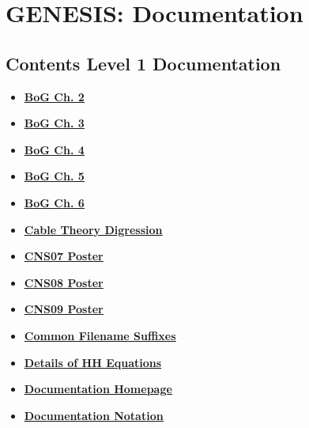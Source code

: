 \documentclass[12pt]{article}
\begin{document}
\section*{GENESIS: Documentation}

\subsection*{Contents Level 1 Documentation}

\begin{itemize}

\item \href{../bog-ch2/bog-ch2.pdf}{\bf \underline{BoG Ch. 2}}

\item \href{../bog-ch3/bog-ch3.pdf}{\bf \underline{BoG Ch. 3}}

\item \href{../bog-ch4/bog-ch4.pdf}{\bf \underline{BoG Ch. 4}}

\item \href{../bog-ch5/bog-ch5.pdf}{\bf \underline{BoG Ch. 5}}

\item \href{../bog-ch6/bog-ch6.pdf}{\bf \underline{BoG Ch. 6}}

\item \href{../cable-theory-digression/cable-theory-digression.pdf}{\bf \underline{Cable Theory Digression}}

\item \href{../CNS07/CNS07.pdf}{\bf \underline{CNS07 Poster}}

\item \href{../CNS08/CNS08.pdf}{\bf \underline{CNS08 Poster}}

\item \href{../CNS09/CNS09.pdf}{\bf \underline{CNS09 Poster}}

\item \href{../common-suffixes/common-suffixes.pdf}{\bf \underline{Common Filename Suffixes}}

\item \href{../hh-model-details/hh-model-details.pdf}{\bf \underline{Details of HH Equations}}

\item \href{../documentation-homepage/documentation-homepage.pdf}{\bf \underline{Documentation Homepage}}

\item \href{../notation/notation.pdf}{\bf \underline{Documentation Notation}}


\end{itemize}
\end{document}
